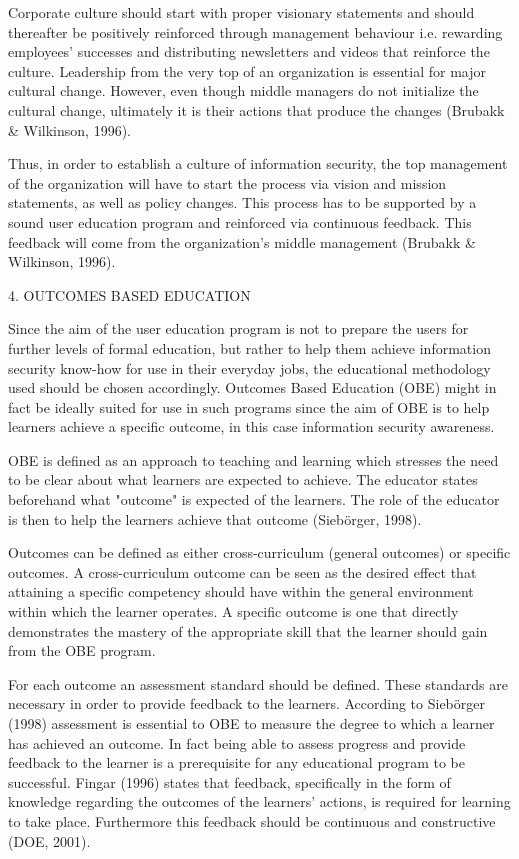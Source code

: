 Corporate culture should start with proper visionary statements
and should thereafter be positively reinforced through management
behaviour i.e. rewarding employees' successes and distributing
newsletters and videos that reinforce the culture. Leadership from
the very top of an organization is essential for major cultural
change. However, even though middle managers do not initialize the
cultural change, ultimately it is their actions that produce the
changes (Brubakk \& Wilkinson, 1996).

Thus, in order to establish a culture of information security, the
top management of the organization will have to start the process
via vision and mission statements, as well as policy changes. This
process has to be supported by a sound user education program and
reinforced via continuous feedback. This feedback will come from
the organization's middle management (Brubakk \& Wilkinson, 1996).

4.  OUTCOMES BASED EDUCATION

Since the aim of the user education program is not to prepare the
users for further levels of formal education, but rather to help
them achieve information security know-how for use in their
everyday jobs, the educational methodology used should be chosen
accordingly. Outcomes Based Education (OBE) might in fact be
ideally suited for use in such programs since the aim of OBE is to
help learners achieve a specific outcome, in this case information
security awareness.

OBE is defined as an approach to teaching and learning which
stresses the need to be clear about what learners are expected to
achieve. The educator states beforehand what "outcome" is expected
of the learners. The role of the educator is then to help the
learners achieve that outcome (Siebörger, 1998).

Outcomes can be defined as either cross-curriculum (general
outcomes) or specific outcomes. A cross-curriculum outcome can be
seen as the desired effect that attaining a specific competency
should have within the general environment within which the
learner operates. A specific outcome is one that directly
demonstrates the mastery of the appropriate skill that the learner
should gain from the OBE program.

For each outcome an assessment standard should be defined. These
standards are necessary in order to provide feedback to the
learners. According to Siebörger (1998) assessment is essential to
OBE to measure the degree to which a learner has achieved an
outcome. In fact being able to assess progress and provide
feedback to the learner is a prerequisite for any educational
program to be successful. Fingar (1996) states that feedback,
specifically in the form of knowledge regarding the outcomes of
the learners' actions, is required for learning to take place.
Furthermore this feedback should be continuous and constructive
(DOE, 2001).

